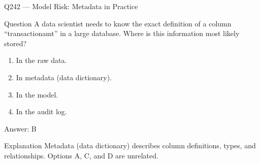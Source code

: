 \documentclass[aspectratio=169,8pt]{beamer}
\begin{document}
																																																	\begin{frame}{Q242 --- Model Risk: Metadata in Practice}
																																																		\begin{block}{Question}
																																																			A data scientist needs to know the exact definition of a column ``transactionamt'' in a large database. Where is this information most likely stored?
																																																			\begin{enumerate}
																																																				\item In the raw data.
																																																				\item In metadata (data dictionary).
																																																				\item In the model.
																																																				\item In the audit log.
																																																			\end{enumerate}  \end{block}
																																																			\begin{exampleblock}{Answer: B}\end{exampleblock}
																																																			\begin{block}{Explanation}
																																																				Metadata (data dictionary) describes column definitions, types, and relationships. Options A, C, and D are unrelated.
																																																			\end{block}
																																																		\end{frame}
																																																		
\end{document}
